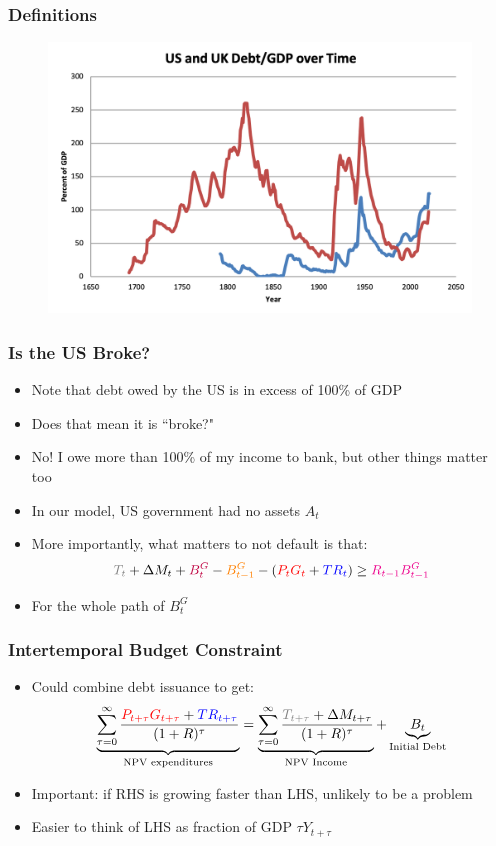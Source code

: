 \documentclass{beamer}
\begin{document}
\begin{frame}
\frametitle{Definitions}
\begin{figure}
\centering
\includegraphics[scale=0.6]{Debt2.png}
\end{figure}
\end{frame}

\begin{frame}
\frametitle{Is the US Broke?}
\begin{itemize}
\item Note that debt owed by the US is in excess of 100\% of GDP
\bigskip
\item Does that mean it is ``broke?"
\bigskip
\item<2-> No!  I owe more than 100\% of my income to bank, but other things matter too
\bigskip
\item<3-> In our model, US government had no assets $A_t$
\bigskip
\item<4-> More importantly, what matters to not default is that:
$$\textcolor{gray}{T_t}+\Delta M_t+\textcolor{purple}{B_t^G}-\textcolor{orange}{B_{t-1}^G}-(\textcolor{red}{P_tG_t}+\textcolor{blue}{TR_t})\geq\textcolor{magenta}{R_{t-1}B_{t-1}^G}$$
\item<5-> For the whole path of $B_t^G$
\end{itemize}
\end{frame}

\begin{frame}
\frametitle{Intertemporal Budget Constraint}
\begin{itemize}
\item Could combine debt issuance to get:
$$\underbrace{\sum_{\tau=0}^\infty\frac{\textcolor{red}{P_{t+\tau}G_{t+\tau}}+\textcolor{blue}{TR_{t+\tau}}}{(1+R)^\tau}}_{\text{NPV expenditures}}=\underbrace{\sum_{\tau=0}^\infty \frac{\textcolor{gray}{T_{t+\tau}}+\Delta M_{t+\tau}}{(1+R)^\tau}}_{\text{NPV Income}}+\underbrace{B_t}_{\text{Initial Debt}}$$
\bigskip
\item Important: if RHS is growing faster than LHS, unlikely to be a problem
\bigskip
\item Easier to think of LHS as fraction of GDP $\tau Y_{t+\tau}$
\end{itemize}
\end{frame}
\end{document}
